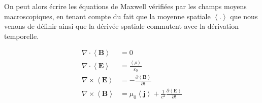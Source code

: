         On peut alors écrire les équations de Maxwell vérifiées par les champs moyens macroscopiques, en tenant compte du fait que la moyenne spatiale $\left<.\right>$ que nous venons de définir ainsi que la dérivée spatiale commutent avec la dérivation temporelle. 

        \begin{align*}
            \nabla \cdot \left<\mathbf{B}\right> &= 0 \\
            \nabla \cdot \left<\mathbf{E}\right> &= \frac{\left<\rho\right>}{\varepsilon_0} \\
            \nabla \times \left<\mathbf{E}\right> &= - \frac{\partial \left<\mathbf{B}\right>}{\partial t} \\
            \nabla \times \left<\mathbf{B}\right> &= \mu_0 \left<\mathbf{j}\right> + \frac{1}{c^2} \frac{\partial \left<\mathbf{E}\right>}{\partial t} \\
        \end{align*}

        



        



        
